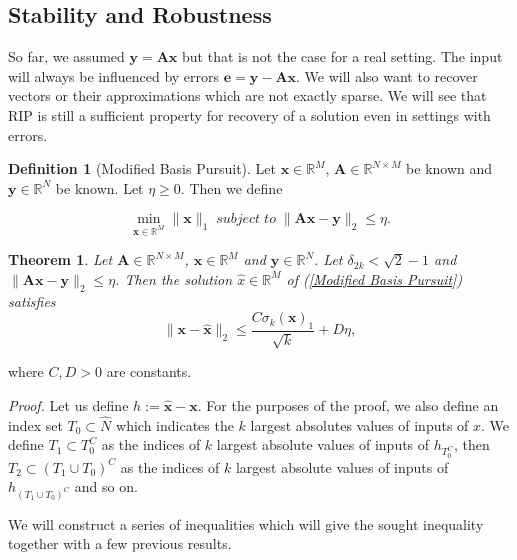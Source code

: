 \documentclass[11pt,oneside,czech,american]{book} %
\theoremstyle{plain}
\newtheorem{thm}{Theorem}
\theoremstyle{definition}
\newtheorem{defn}{Definition}
\begin{document}
\subsection*{Stability and Robustness}
So far, we assumed $\bm{y} = \bm{Ax}$ but that is not the case for a real setting. The input will always be influenced by errors $\bm{e} = \bm{y} - \bm{Ax}$. We will also want to recover vectors or their approximations which are not exactly sparse. We will see that RIP is still a sufficient property for recovery of a solution even in settings with errors.

\begin{defn}[Modified Basis Pursuit]
	Let $\bm{x} \in \mathbb{R}^{M}$, $\bm{A} \in \mathbb{R}^{N \times M}$ be known and $\bm{y} \in \mathbb{R}^{N}$ be known. Let $\eta \geq 0$. Then we define
	
	\begin{equation}
		\min_{\bm{{x}} \in \mathbb{R}^{M}}\lVert \bm{x}\rVert_{1} \; subject \; to\;  \lVert \bm{A} \bm{x} - \bm{y} \rVert_2 \leq \eta. \label{Modified Basis Pursuit}
	\end{equation}
\end{defn}

\begin{thm}
	Let $\bm{A} \in \mathbb{R}^{N \times M}$, $\bm{x} \in \mathbb{R}^{M}$ and $\bm{y} \in \mathbb{R}^{N}$. Let $\delta_{2k} < \sqrt 2  -1$ and $\lVert \bm{Ax}-\bm{y}\rVert_2 \leq \eta$. Then the solution $\hat{x} \in \mathbb{R}^M$ of (\ref{Modified Basis Pursuit}) satisfies
	\begin{equation}
		\lVert\bm{x} - \bm{\hat{x}}\rVert_2 \leq \frac{C \sigma_k(\bm{x})_1}{\sqrt k} + D \eta, \label{approximation of solution}
	\end{equation}
\end{thm}
where $C,D > 0$ are constants.

\emph{Proof.} Let us define $h:= \hat{\bm{x}} - \bm{x}$. For the purposes of the proof, we also define an index set $T_0 \subset \hat{N}$ which indicates the $k$ largest absolutes values of inputs of $x$. We define $T_1 \subset T^C_0$ as the indices of $k$ largest absolute values of inputs of $h_{T^C_0}$, then $T_2 \subset (T_1 \cup T_0)^C$ as the indices of $k$ largest absolute values of inputs of $h_{(T_1 \cup T_0)^C}$ and so on.

We will construct a series of inequalities which will give the sought inequality together with a few previous results.
\end{document}
